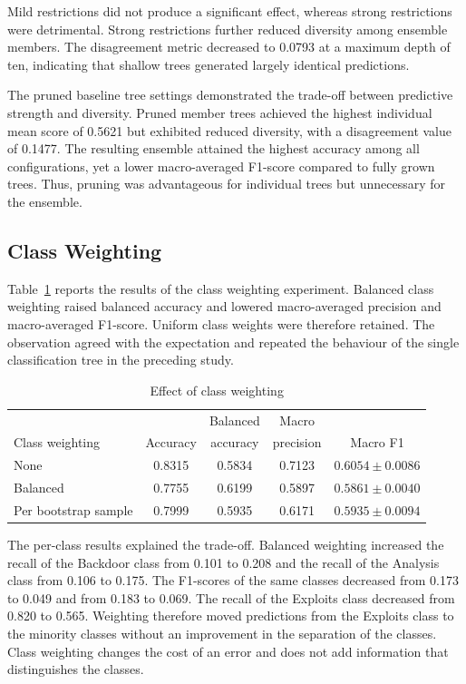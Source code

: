 \documentclass[conference]{IEEEtran}
\begin{document}
Mild restrictions did not produce a significant effect, whereas strong restrictions were detrimental. Strong restrictions further reduced diversity among ensemble members. The disagreement metric decreased to 0.0793 at a maximum depth of ten, indicating that shallow trees generated largely identical predictions.

The pruned baseline tree settings demonstrated the trade-off between predictive strength and diversity. Pruned member trees achieved the highest individual mean score of 0.5621 but exhibited reduced diversity, with a disagreement value of 0.1477. The resulting ensemble attained the highest accuracy among all configurations, yet a lower macro-averaged F1-score compared to fully grown trees. Thus, pruning was advantageous for individual trees but unnecessary for the ensemble.

\subsection{Class Weighting}

Table~\ref{tab:weights} reports the results of the class weighting experiment. Balanced class weighting raised balanced accuracy and lowered macro-averaged precision and macro-averaged F1-score. Uniform class weights were therefore retained. The observation agreed with the expectation and repeated the behaviour of the single classification tree in the preceding study.

\begin{table}[!t]
\caption{Effect of class weighting}
\label{tab:weights}
\centering
\setlength{\tabcolsep}{3.5pt}
\begin{tabular}{@{}lcccc@{}}
\toprule
 & & Balanced & Macro & \\
Class weighting & Accuracy & accuracy & precision & Macro F1 \\
\midrule
None & 0.8315 & 0.5834 & 0.7123 & $0.6054\pm0.0086$ \\
Balanced & 0.7755 & 0.6199 & 0.5897 & $0.5861\pm0.0040$ \\
Per bootstrap sample & 0.7999 & 0.5935 & 0.6171 & $0.5935\pm0.0094$ \\
\bottomrule
\end{tabular}
\end{table}

The per-class results explained the trade-off. Balanced weighting increased the recall of the Backdoor class from 0.101 to 0.208 and the recall of the Analysis class from 0.106 to 0.175. The F1-scores of the same classes decreased from 0.173 to 0.049 and from 0.183 to 0.069. The recall of the Exploits class decreased from 0.820 to 0.565. Weighting therefore moved predictions from the Exploits class to the minority classes without an improvement in the separation of the classes. Class weighting changes the cost of an error and does not add information that distinguishes the classes.
\end{document}

